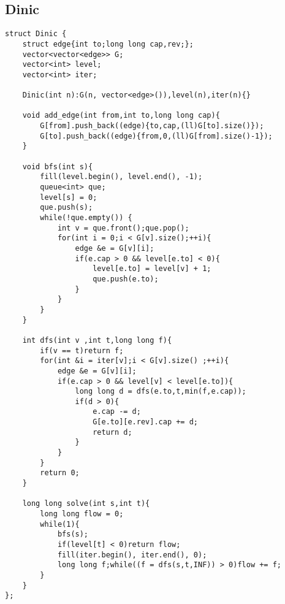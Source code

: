 \documentclass[10pt]{article}
\begin{document}
\subsection{Dinic}
\begin{lstlisting}
struct Dinic {
	struct edge{int to;long long cap,rev;};
	vector<vector<edge>> G;
	vector<int> level;
	vector<int> iter;

	Dinic(int n):G(n, vector<edge>()),level(n),iter(n){}

	void add_edge(int from,int to,long long cap){
		G[from].push_back((edge){to,cap,(ll)G[to].size()});
		G[to].push_back((edge){from,0,(ll)G[from].size()-1});
	}

	void bfs(int s){
		fill(level.begin(), level.end(), -1);
		queue<int> que;
		level[s] = 0;
		que.push(s);
		while(!que.empty())	{
			int v = que.front();que.pop();
			for(int i = 0;i < G[v].size();++i){
				edge &e = G[v][i];
				if(e.cap > 0 && level[e.to] < 0){
					level[e.to] = level[v] + 1;
					que.push(e.to);
				}
			}
		}
	}

	int dfs(int v ,int t,long long f){
		if(v == t)return f;
		for(int &i = iter[v];i < G[v].size() ;++i){
			edge &e = G[v][i];
			if(e.cap > 0 && level[v] < level[e.to]){
				long long d = dfs(e.to,t,min(f,e.cap));
				if(d > 0){
					e.cap -= d;
					G[e.to][e.rev].cap += d;
					return d;
				}
			}
		}
		return 0;
	}

	long long solve(int s,int t){
		long long flow = 0;
		while(1){
			bfs(s);
			if(level[t] < 0)return flow;
			fill(iter.begin(), iter.end(), 0);
			long long f;while((f = dfs(s,t,INF)) > 0)flow += f;
		}
	}
};
\end{lstlisting}
\end{document}
